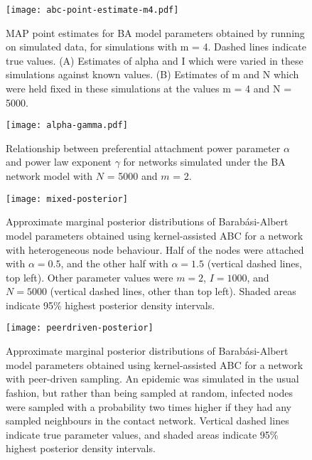 \begin{figure}[ht]
  \centering
  \texttt{[image: abc-point-estimate-m4.pdf]}
  \caption[
    \Acrlong{MAP} point estimates for \gls{BA} model parameters obtained by
    running  on simulated data, for simulations with \gls{m} = 3.
  ]{
    \Acrlong{MAP} point estimates for \gls{BA} model parameters obtained by
    running  on simulated data, for simulations with \gls{m} = 4.
    Dashed lines indicate true values. (A) Estimates of \gls{alpha} and \gls{I}
    which were varied in these simulations against known values. (B) Estimates
    of \gls{m} and \gls{N} which were held fixed in these simulations at the
    values \gls{m} = 4 and \gls{N} = 5000.
  }        
  \label{fig:abcptm4}
\end{figure}

\begin{figure}[ht]
  \centering
  \texttt{[image: alpha-gamma.pdf]}
  \caption{
      Relationship between preferential attachment power parameter $\alpha$
      and power law exponent $\gamma$ for networks simulated under the BA
      network model with $N$ = 5000 and $m$ = 2.
  }
  \label{fig:gamma}
\end{figure}

\begin{figure}[ht]
    \centering
    \texttt{[image: mixed-posterior]}
    \caption[Approximate marginal posterior distributions of BA model
        parameters obtained using kernel-assisted ABC for a network with heterogeneous
        node behaviour.]
    {
        Approximate marginal posterior distributions of Barab\'asi-Albert
        model parameters obtained using kernel-assisted ABC for a network with
        heterogeneous node behaviour. Half of the nodes were attached with
        $\alpha = 0.5$, and the other half with $\alpha = 1.5$ (vertical
        dashed lines, top left). Other parameter values were $m = 2$, $I =
        1000$, and $N = 5000$ (vertical dashed lines, other than top left).
        Shaded areas indicate 95\% highest posterior density intervals.
    }
    \label{fig:mixed}
\end{figure}

\begin{figure}[ht]
    \centering
    \texttt{[image: peerdriven-posterior]}
    \caption[Approximate marginal posterior distributions of Barab\'asi-Albert
        model parameters obtained using kernel-assisted ABC for a network with
        peer-driven sampling.]
    {
        Approximate marginal posterior distributions of Barab\'asi-Albert
        model parameters obtained using kernel-assisted ABC for a network with
        peer-driven sampling. An epidemic was simulated in the usual fashion,
        but rather than being sampled at random, infected nodes were sampled
        with a probability two times higher if they had any sampled neighbours
        in the contact network. Vertical dashed lines indicate true parameter
        values, and shaded areas indicate 95\% highest posterior density
        intervals.
    }
    \label{fig:peerdriven}
\end{figure}


